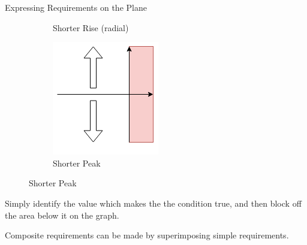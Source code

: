 \documentclass{../templates/topic}
\begin{document}
\begin{section}{Expressing Requirements on the Plane}
\begin{figure}
\begin{subfigure}[b]{0.4\textwidth}
		\caption{Shorter Rise (radial)}
		\end{subfigure}
		\begin{subfigure}[b]{0.4\textwidth}
		\includegraphics[width=\textwidth]{assets/complex_plane_peak.png}
		\caption{Shorter Peak}
		\end{subfigure}

	\end{figure}
	
	Simply identify the value which makes the the condition true, and then block off the area below it on the graph.
	
	Composite requirements can be made by superimposing simple requirements.

\end{section}
\end{document}

